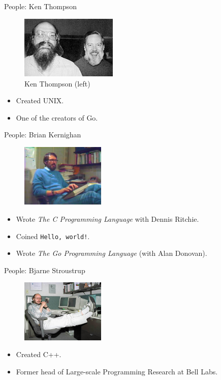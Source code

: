\begin{frame}{People: Ken Thompson}
  \begin{figure}
    \includegraphics[height=3cm]{img/ritchie-thompson.jpg}
    \caption*{Ken Thompson (left)}
  \end{figure}
  \begin{itemize}
    \item Created UNIX.
    \item One of the creators of Go.
  \end{itemize}
\end{frame}


\begin{frame}{People: Brian Kernighan}
  \begin{figure}
    \includegraphics[height=3cm]{img/brian-kernighan.jpg}
  \end{figure}
  \begin{itemize}
    \item Wrote \emph{The C Programming Language} with Dennis Ritchie.
    \item Coined \texttt{Hello, world!}.
    \item Wrote \emph{The Go Programming Language} (with Alan Donovan).
  \end{itemize}
\end{frame}

\begin{frame}{People: Bjarne Stroustrup}
  \begin{figure}
    \includegraphics[height=3cm]{img/bjarne-stroustrup.jpg}
  \end{figure}
  \begin{itemize}
    \item Created C++.
    \item Former head of Large-scale Programming Research at Bell Labs.
  \end{itemize}
\end{frame}

